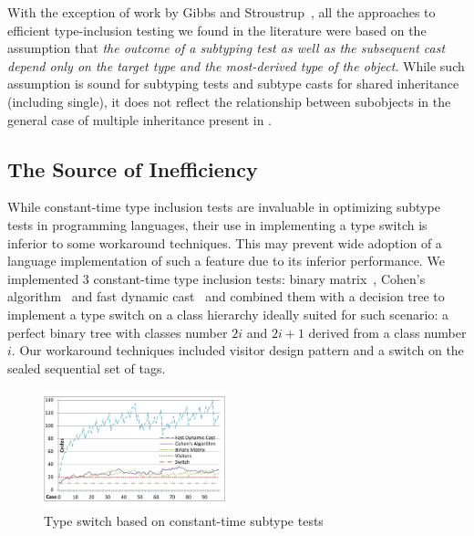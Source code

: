 With the exception of work by Gibbs and Stroustrup~\cite{FastDynCast}, all the 
approaches to efficient type-inclusion testing we found in the literature were 
based on the assumption that \emph{the outcome of a subtyping test as well as 
the subsequent cast depend only on the target type and the most-derived type of 
the object}. While such assumption is sound for subtyping tests and subtype 
casts for shared inheritance (including single), it does not reflect the 
relationship between subobjects in the general case of multiple inheritance 
present in \Cpp{}.

\subsection{The Source of Inefficiency}

While constant-time type inclusion tests are invaluable in optimizing subtype 
tests in programming languages, their use in implementing a type switch is 
inferior to some workaround techniques. This may prevent wide adoption of a 
language implementation of such a feature due to its inferior performance. 
We implemented 3 constant-time type inclusion tests: binary 
matrix~\cite{Vitek97}, Cohen's algorithm~\cite{Cohen91} and fast dynamic 
cast~\cite{FastDynCast} and combined them with a decision tree to implement a 
type switch on a class hierarchy ideally suited for such scenario: a perfect binary tree with 
classes number $2i$ and $2i+1$ derived from a class number $i$. Our workaround 
techniques included visitor design pattern and a switch on the sealed sequential 
set of tags.

\begin{figure}[htbp]
  \centering
    \includegraphics[width=0.47\textwidth]{DCast-vs-Visitors.pdf}
  \caption{Type switch based on constant-time subtype tests}
  \label{fig:DCastVis2}
\end{figure}

